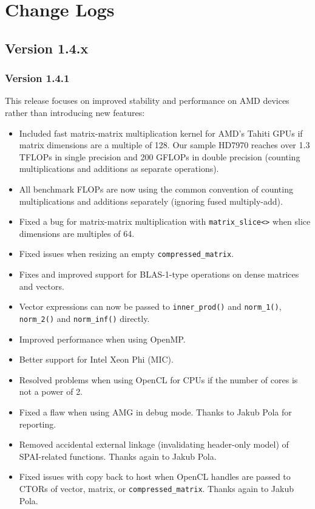 
\chapter{Change Logs} %

\section*{Version 1.4.x}

\subsection*{Version 1.4.1}
This release focuses on improved stability and performance on AMD devices rather than introducing new features:
\begin{itemize}
 \item Included fast matrix-matrix multiplication kernel for AMD's Tahiti GPUs if matrix dimensions are a multiple of 128.
       Our sample HD7970 reaches over 1.3 TFLOPs in single precision and 200 GFLOPs in double precision (counting multiplications and additions as separate operations).
 \item All benchmark FLOPs are now using the common convention of counting multiplications and additions separately (ignoring fused multiply-add).
 \item Fixed a bug for matrix-matrix multiplication with \lstinline|matrix_slice<>| when slice dimensions are multiples of 64.
 \item Fixed issues when resizing an empty \lstinline|compressed_matrix|.
 \item Fixes and improved support for BLAS-1-type operations on dense matrices and vectors.
 \item Vector expressions can now be passed to \lstinline|inner_prod()| and \lstinline|norm_1()|, \lstinline|norm_2()| and \lstinline|norm_inf()| directly.
 \item Improved performance when using OpenMP.
 \item Better support for Intel Xeon Phi (MIC).
 \item Resolved problems when using OpenCL for CPUs if the number of cores is not a power of 2.
 \item Fixed a flaw when using AMG in debug mode. Thanks to Jakub Pola for reporting.
 \item Removed accidental external linkage (invalidating header-only model) of SPAI-related functions. Thanks again to Jakub Pola.
 \item Fixed issues with copy back to host when OpenCL handles are passed to CTORs of vector, matrix, or \lstinline|compressed_matrix|. Thanks again to Jakub Pola.

\end{itemize}
